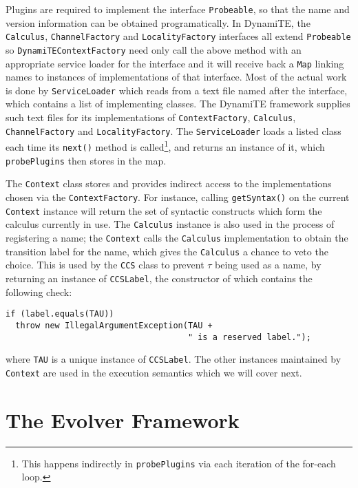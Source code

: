 \noindent Plugins are required to implement the interface
\texttt{Probeable}, so that the name and version information can be
obtained programatically.  In DynamiTE, the \texttt{Calculus},
\texttt{ChannelFactory} and \texttt{LocalityFactory} interfaces all
extend \texttt{Probeable} so \texttt{DynamiTEContextFactory} need only
call the above method with an appropriate service loader for the
interface and it will receive back a \texttt{Map} linking names to
instances of implementations of that interface.  Most of the actual
work is done by \texttt{ServiceLoader} which reads from a text file
named after the interface, which contains a list of implementing
classes.  The DynamiTE framework supplies such text files for its
implementations of \texttt{ContextFactory}, \texttt{Calculus},
\texttt{ChannelFactory} and \texttt{LocalityFactory}.  The
\texttt{ServiceLoader} loads a listed class each time its
\texttt{next()} method is called\footnote{This happens indirectly in
  \texttt{probePlugins} via each iteration of the for-each loop.}, and
returns an instance of it, which \texttt{probePlugins} then stores in
the map.

The \texttt{Context} class stores and provides indirect access to the
implementations chosen via the \texttt{ContextFactory}.  For instance,
calling \texttt{getSyntax()} on the current \texttt{Context} instance
will return the set of syntactic constructs which form the calculus
currently in use.  The \texttt{Calculus} instance is also used in the
process of registering a name; the \texttt{Context} calls the
\texttt{Calculus} implementation to obtain the transition label for
the name, which gives the \texttt{Calculus} a chance to veto the
choice.  This is used by the \texttt{CCS} class to prevent $\tau$
being used as a name, by returning an instance of \texttt{CCSLabel},
the constructor of which contains the following check:

\begin{verbatim}
if (label.equals(TAU))
  throw new IllegalArgumentException(TAU +
                                     " is a reserved label.");
\end{verbatim}

\noindent where \texttt{TAU} is a unique instance of
\texttt{CCSLabel}.  The other instances maintained by \texttt{Context}
are used in the execution semantics which we will cover next.

\section{The Evolver Framework}
\label{dyn:evolvers}

